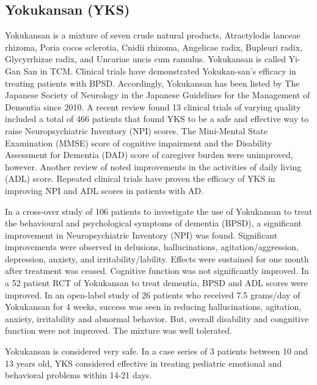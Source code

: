 \documentclass[twocolumn]{article}
\begin{document}

\subsection{Yokukansan (YKS)}
Yokukansan is a mixture of seven crude natural products,
Atractylodis lanceae rhizoma,
Poria cocos sclerotia,
Cnidii rhizoma,
Angelicae radix,
Bupleuri radix,
Glycyrrhizae radix,
and Uncariae uncis cum ramulus.
Yokukansan is called Yi-Gan San in TCM.
\cite{iwasaki2005randomized}
Clinical trials have demonstrated Yokukan-san’s efficacy
in treating patients with BPSD. Accordingly,
Yokukansan has been listed by The Japanese Society of Neurology
in the Japanese Guidelines for the Management of Dementia
since 2010.
A recent review found 13 clinical trials of varying quality
included a total of 466 patients that found YKS to be a safe
and effective way to raise Neuropsychiatric Inventory (NPI) scores.
The Mini-Mental State Examination (MMSE) score of cognitive impairment
and the Disability Assessment for Dementia (DAD) score of caregiver burden
were unimproved, however.
\cite{okamoto2014yokukan}
Another review of noted improvements in the activities of daily living (ADL) score.
\cite{matsuda2013yokukansan}
Repeated clinical trials have proven the efficacy of YKS in improving
NPI and ADL scores in patients with AD.
\cite{mizukami2014kampo}

In a cross-over study of 106 patients to investigate the use of Yokukansan
to treat the behavioural and psychological symptoms of dementia (BPSD),
a significant improvement in
Neuropsychiatric Inventory (NPI) was found.
Significant improvements were observed in delusions,
hallucinations, agitation/aggression, depression, anxiety, and irritability/lability.
Effects were sustained for one month after treatment was ceased.
Cognitive function was not significantly improved.
\cite{mizukami2009randomized}
In a 52 patient RCT of Yokukansan to treat dementia,
BPSD and ADL scores were improved.
\cite{iwasaki2005randomized}
In an open-label study of 26 patients who received
7.5 grams/day of Yokukansan for 4 weeks,
success was seen in reducing
hallucinations, agitation, anxiety, irritability
and abnormal behavior.
But, overall disability and congnitive function were not improved.
The mixture was well tolerated.
\cite{hayashi2010treatment}


Yokukansan is considered very safe.
In a case series of 3 patients between 10 and 13 years old,
YKS considered effective in treating pediatric emotional and behavioral problems
within 14-21 days.
\cite{tanaka2013potential}
\end{document}
